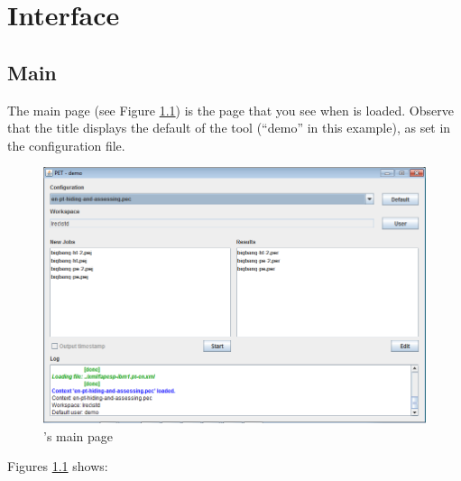 \chapter{Interface}

\section{Main}

The main page (see Figure \ref{fig:main}) is the page that you see when \PET is loaded. 
Observe that the title displays the default  of the tool (``demo'' in this example), as set in the configuration file.

\begin{figure}[h]\label{fig:main}
\includegraphics[width=1\textwidth]{img/main}
\caption{\PET's main page}
\end{figure}

Figures \ref{fig:main} shows:

